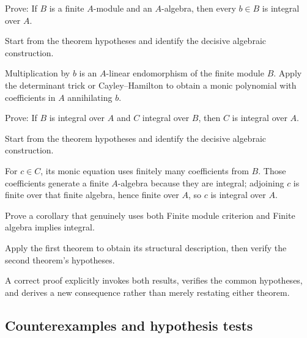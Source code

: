 \begin{exercise}\label{exr:v19-expand-07}
Prove: If $B$ is a finite $A$-module and an $A$-algebra, then every $b\in B$ is integral over $A$.
\end{exercise}
\begin{hint}
Start from the theorem hypotheses and identify the decisive algebraic construction.
\end{hint}
\begin{solution}
Multiplication by $b$ is an $A$-linear endomorphism of the finite module $B$. Apply the determinant trick or Cayley--Hamilton to obtain a monic polynomial with coefficients in $A$ annihilating $b$.
\end{solution}

\begin{exercise}\label{exr:v19-expand-08}
Prove: If $B$ is integral over $A$ and $C$ integral over $B$, then $C$ is integral over $A$.
\end{exercise}
\begin{hint}
Start from the theorem hypotheses and identify the decisive algebraic construction.
\end{hint}
\begin{solution}
For $c\in C$, its monic equation uses finitely many coefficients from $B$. Those coefficients generate a finite $A$-algebra because they are integral; adjoining $c$ is finite over that finite algebra, hence finite over $A$, so $c$ is integral over $A$.
\end{solution}

\begin{exercise}\label{exr:v19-expand-09}
Prove a corollary that genuinely uses both Finite module criterion and Finite algebra implies integral.
\end{exercise}
\begin{hint}
Apply the first theorem to obtain its structural description, then verify the second theorem's hypotheses.
\end{hint}
\begin{solution}
A correct proof explicitly invokes both results, verifies the common hypotheses, and derives a new consequence rather than merely restating either theorem.
\end{solution}

\subsection*{Counterexamples and hypothesis tests}


